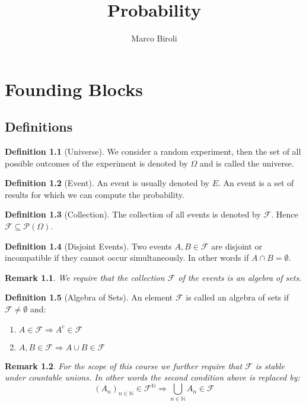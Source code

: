 \documentclass[10pt,a4paper]{book}
\author{Marco Biroli}
\title{Probability}
\newtheorem*{remark}{Remark}
\theoremstyle{definition}
\newtheorem{definition}{Definition}[section]
\begin{document}
\maketitle
\tableofcontents
\chapter{Founding Blocks}
\section{Definitions}

\begin{definition}[Universe]
We consider a random experiment, then the set of all possible outcomes of the experiment is denoted by $\Omega$ and is called the universe.
\end{definition}

\begin{definition}[Event]
An event is usually denoted by $E$. An event is a set of results for which we can compute the probability.
\end{definition}

\begin{definition}[Collection]
The collection of all events is denoted by $\mathcal{F}$. Hence $\mathcal{F} \subseteq \mathcal{P}(\Omega)$.
\end{definition}

\begin{definition}[Disjoint Events]
Two events $A, B \in \mathcal{F}$ are disjoint or incompatible if they cannot occur simultaneously. In other words if $A \cap B = \emptyset$.
\end{definition}

\begin{remark}
We require that the collection $\mathcal{F}$ of the events is an algebra of sets.
\end{remark}

\begin{definition}[Algebra of Sets]
An element $\mathcal{F}$ is called an algebra of sets if $\mathcal{F} \neq \emptyset$ and:
\begin{enumerate}
\item $A \in \mathcal{F} \Rightarrow A^c \in \mathcal{F}$
\item $A, B \in \mathcal{F} \Rightarrow A \cup B \in \mathcal{F}$
\end{enumerate}
\end{definition}

\begin{remark}
For the scope of this course we further require that $\mathcal{F}$ is stable under countable unions. In other words the second condition above is replaced by:
\[
(A_n)_{n \in \mathbb{N}} \in \mathcal{F}^\mathbb{N} \Rightarrow \bigcup_{n \in \mathbb{N}} A_n \in \mathcal{F}
\]
\end{remark}
\end{document}
